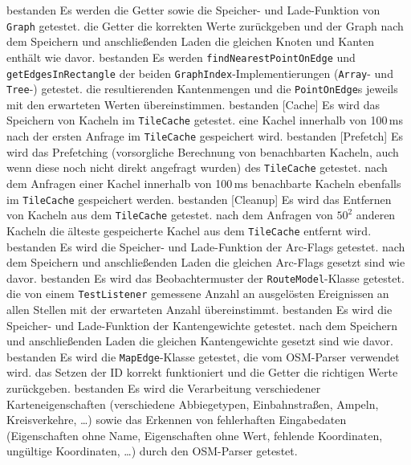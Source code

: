 \documentclass[a4paper, 11pt]{article}
\newcommand{\code}[1]{\texttt{#1}}
\begin{document}
\begin{itemize}
     {bestanden}
     {Es werden die Getter sowie die Speicher- und Lade-Funktion von \code{Graph} getestet.}
     {die Getter die korrekten Werte zurückgeben und der Graph nach dem Speichern und anschließenden Laden die gleichen Knoten und Kanten enthält wie davor.}
     {bestanden}
     {Es werden \code{findNearestPointOnEdge} und \code{getEdgesInRectangle} der beiden \code{GraphIndex}-Implementierungen (\code{Array}- und \code{Tree}-) getestet.}
     {die resultierenden Kantenmengen und die \code{PointOnEdge}s jeweils mit den erwarteten Werten übereinstimmen.}
     {bestanden}
[Cache]
     {Es wird das Speichern von Kacheln im \code{TileCache} getestet.}
     {eine Kachel innerhalb von 100\,ms nach der ersten Anfrage im \code{TileCache} gespeichert wird.}
     {bestanden}
[Prefetch]
     {Es wird das Prefetching (vorsorgliche Berechnung von benachbarten Kacheln, auch wenn diese noch nicht direkt angefragt wurden) des \code{TileCache} getestet.}
     {nach dem Anfragen einer Kachel innerhalb von 100\,ms benachbarte Kacheln ebenfalls im \code{TileCache} gespeichert werden.}
     {bestanden}
[Cleanup]
     {Es wird das Entfernen von Kacheln aus dem \code{TileCache} getestet.}
     {nach dem Anfragen von $50^2$ anderen Kacheln die älteste gespeicherte Kachel aus dem \code{TileCache} entfernt wird.}
     {bestanden}
     {Es wird die Speicher- und Lade-Funktion der Arc-Flags getestet.}
     {nach dem Speichern und anschließenden Laden die gleichen Arc-Flags gesetzt sind wie davor.}
     {bestanden}
     {Es wird das Beobachtermuster der \code{RouteModel}-Klasse getestet.}
     {die von einem \code{TestListener} gemessene Anzahl an ausgelösten Ereignissen an allen Stellen mit der erwarteten Anzahl übereinstimmt.}
     {bestanden}
     {Es wird die Speicher- und Lade-Funktion der Kantengewichte getestet.}
     {nach dem Speichern und anschließenden Laden die gleichen Kantengewichte gesetzt sind wie davor.}
     {bestanden}
     {Es wird die \code{MapEdge}-Klasse getestet, die vom OSM-Parser verwendet wird.}
     {das Setzen der ID korrekt funktioniert und die Getter die richtigen Werte zurückgeben.}
     {bestanden}
     {Es wird die Verarbeitung verschiedener Karteneigenschaften (verschiedene Abbiegetypen, Einbahnstraßen, Ampeln, Kreisverkehre, \dots) sowie das Erkennen von fehlerhaften Eingabedaten (Eigenschaften ohne Name, Eigenschaften ohne Wert, fehlende Koordinaten, ungültige Koordinaten, \dots) durch den OSM-Parser getestet.}

\end{itemize}
\end{document}
